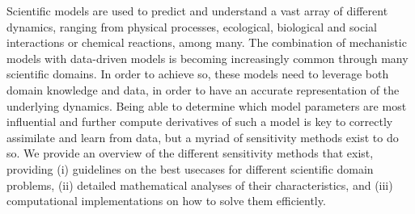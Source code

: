 Scientific models are used to predict and understand a vast array of different dynamics, ranging from physical processes, ecological, biological and social interactions or chemical reactions, among many. 
The combination of mechanistic models with data-driven models is becoming increasingly common through many scientific domains. 
In order to achieve so, these models need to leverage both domain knowledge and data, in order to have an accurate representation of the underlying dynamics. 
Being able to determine which model parameters are most influential and further compute derivatives of such a model is key to correctly assimilate and learn from data, but a myriad of sensitivity methods exist to do so. 
We provide an overview of the different sensitivity methods that exist, providing (i) guidelines on the best usecases for different scientific domain problems, (ii) detailed mathematical analyses of their characteristics, and (iii) computational implementations on how to solve them efficiently. 
